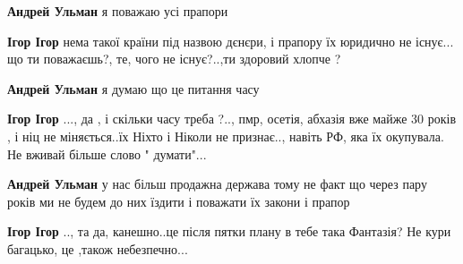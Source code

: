 \begin{itemize}
\begin{itemize}
\begin{itemize}
\textbf{Андрей Ульман} я поважаю усі прапори

 
\textbf{Ігор Ігор} нема такої країни під назвою дєнєри, і прапору їх юридично
не існує... що ти поважаєшь?, те, чого не існує?..,ти здоровий хлопче ?

 
\textbf{Андрей Ульман} я думаю що це питання часу

 
\textbf{Ігор Ігор} ..., да , і скільки часу треба ?.., пмр, осетія, абхазія вже майже 30 років , і ніц не міняється..їх Ніхто і Ніколи не признає.., навіть РФ, яка їх окупувала.
Не вживай більше слово " думати"...

 
\textbf{Андрей Ульман} у нас більш продажна держава тому не факт що через пару років ми не будем до них їздити і поважати їх закони і прапор

 
\textbf{Ігор Ігор} .., та да, канешно..це після пятки плану в тебе така Фантазія?
Не кури багацько, це ,також небезпечно...
\end{itemize}

 

\end{itemize}
\end{itemize}
